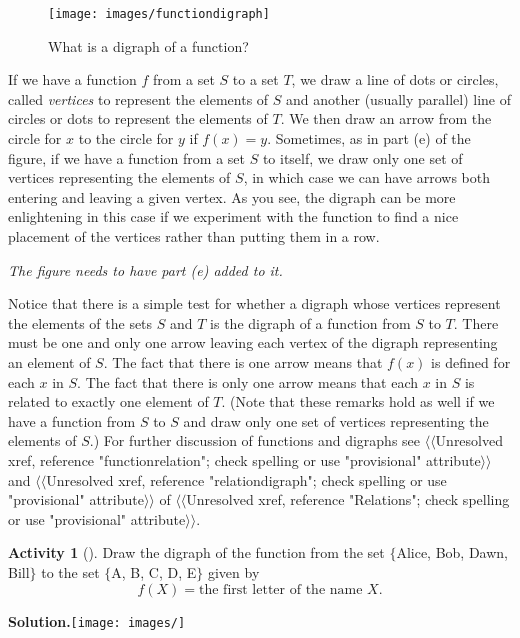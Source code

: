 \documentclass[10pt,]{book}
\theoremstyle{plain}
\theoremstyle{definition}
\newtheorem{activity}[project]{Activity}
\numberwithin{equation}{chapter}
\begin{document}
\begin{figure}
\centering
\texttt{[image: images/functiondigraph]}
\caption{What is a digraph of a function?\label{functiondigraphs}}
\end{figure}
If we have a function \(f\) from a set \(S\) to a set \(T\), we draw a line of dots or circles, called \emph{vertices} to represent the elements of \(S\) and another (usually parallel) line of circles or dots to represent the elements of \(T\). We then draw an arrow from the circle for \(x\) to the circle for \(y\) if \(f(x) = y\). Sometimes, as in part (e) of the figure, if we have a function from a set \(S\) to itself, we draw only one set of vertices representing the elements of \(S\), in which case we can have arrows both entering and leaving a given vertex. As you see, the digraph can be more enlightening in this case if we experiment with the function to find a nice placement of the vertices rather than putting them in a row.%
\par
\emph{The figure needs to have part (e) added to it.}%
\par
Notice that there is a simple test for whether a digraph whose vertices represent the elements of the sets \(S\) and \(T\) is the digraph of a function from \(S\) to \(T\). There must be one and only one arrow leaving each vertex of the digraph representing an element of \(S\). The fact that there is one arrow means that \(f(x)\) is defined for each \(x\) in \(S\). The fact that there is only one arrow means that each \(x\) in \(S\) is related to exactly one element of \(T\). (Note that these remarks hold as well if we have a function from \(S\) to \(S\) and draw only one set of vertices representing the elements of \(S\).) For further discussion of functions and digraphs see {$\langle\langle$Unresolved xref, reference "functionrelation"; check spelling or use "provisional" attribute$\rangle\rangle$} and {$\langle\langle$Unresolved xref, reference "relationdigraph"; check spelling or use "provisional" attribute$\rangle\rangle$} of {{$\langle\langle$Unresolved xref, reference "Relations"; check spelling or use "provisional" attribute$\rangle\rangle$}}.%
\begin{activity}[]\label{activity-23}
Draw the digraph of the function from the set \(\{\)Alice, Bob, Dawn, Bill\(\}\) to the set \(\{\)A, B, C, D, E\(\}\) given by%
\begin{equation*}
f(X) = \mbox{the first
letter of the name \(X\)} .
\end{equation*}
%
\par\medskip\noindent%
\textbf{Solution.}\quad \texttt{[image: images/]}
%
\end{activity}
\end{document}
